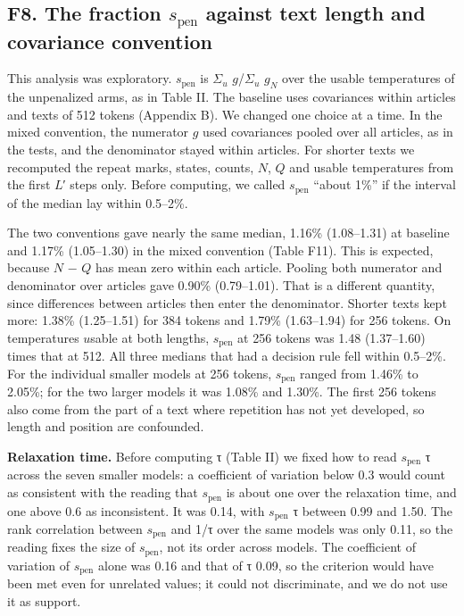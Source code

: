 \documentclass[aps,prx,onecolumn,superscriptaddress,longbibliography]{revtex4-2}
\providecommand{\texorpdfstring}[2]{#1}
\begin{document}
\subsection*{\texorpdfstring{F8. The fraction \(s_{\mathrm{pen}}\) against text length and covariance convention}{F8. The fraction s\_\{\textbackslash mathrm\{pen\}\} against text length and covariance convention}}

This analysis was exploratory. \(s_{\mathrm{pen}}\) is \(\Sigma_{u}\) \(g\)/\(\Sigma_{u}\) \(g_{N}\) over the usable temperatures of the unpenalized arms, as in Table II. The baseline uses covariances within articles and texts of 512 tokens (Appendix B). We changed one choice at a time. In the mixed convention, the numerator \(g\) used covariances pooled over all articles, as in the tests, and the denominator stayed within articles. For shorter texts we recomputed the repeat marks, states, counts, \(N\), \(Q\) and usable temperatures from the first \(L\)′ steps only. Before computing, we called \(s_{\mathrm{pen}}\) ``about 1\%'' if the interval of the median lay within 0.5--2\%.

The two conventions gave nearly the same median, 1.16\% (1.08--1.31) at baseline and 1.17\% (1.05--1.30) in the mixed convention (Table F11). This is expected, because \(N\) − \(Q\) has mean zero within each article. Pooling both numerator and denominator over articles gave 0.90\% (0.79--1.01). That is a different quantity, since differences between articles then enter the denominator. Shorter texts kept more: 1.38\% (1.25--1.51) for 384 tokens and 1.79\% (1.63--1.94) for 256 tokens. On temperatures \(u\)sable at both lengths, \(s_{\mathrm{pen}}\) at 256 tokens was 1.48 (1.37--1.60) times that at 512. All three medians that had a decision rule fell within 0.5--2\%. For the individual smaller models at 256 tokens, \(s_{\mathrm{pen}}\) ranged from 1.46\% to 2.05\%; for the two larger models it was 1.08\% and 1.30\%. The first 256 tokens also come from the part of a text where repetition has not yet developed, so length and position are confounded.

\textbf{Relaxation time.} Before computing τ (Table II) we fixed how to read \(s_{\mathrm{pen}}\) τ across the seven smaller models: a coefficient of variation below 0.3 would count as consistent with the reading that \(s_{\mathrm{pen}}\) is about one over the relaxation time, and one above 0.6 as inconsistent. It was 0.14, with \(s_{\mathrm{pen}}\) τ between 0.99 and 1.50. The rank correlation between \(s_{\mathrm{pen}}\) and 1/τ over the same models was only 0.11, so the reading fixes the size of \(s_{\mathrm{pen}}\), not its order across models. The coefficient of variation of \(s_{\mathrm{pen}}\) alone was 0.16 and that of τ 0.09, so the criterion would have been met even for unrelated values; it could not discriminate, and we do not use it as support.
\end{document}
